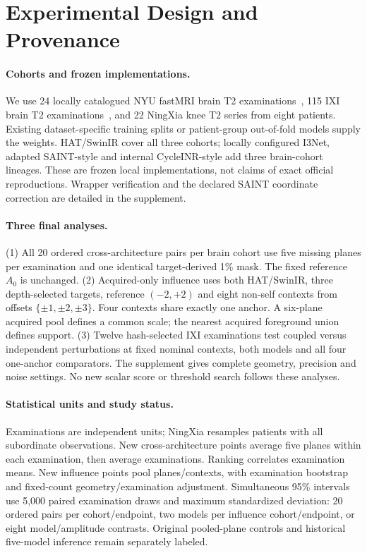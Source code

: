 \documentclass[10pt,twocolumn,letterpaper]{article}
\begin{document}
\section{Experimental Design and Provenance}
\paragraph{Cohorts and frozen implementations.}
We use 24 locally catalogued NYU fastMRI brain T2 examinations~\cite{knoll2020fastmri,muckley2021brain,fastmri_portal}, 115 IXI brain T2 examinations~\cite{ixi_dataset}, and 22 NingXia knee T2 series from eight patients. Existing dataset-specific training splits or patient-group out-of-fold models supply the weights. HAT/SwinIR cover all three cohorts; locally configured I3Net, adapted SAINT-style and internal CycleINR-style add three brain-cohort lineages. These are frozen local implementations, not claims of exact official reproductions. Wrapper verification and the declared SAINT coordinate correction are detailed in the supplement.

\paragraph{Three final analyses.}
(1) All 20 ordered cross-architecture pairs per brain cohort use five missing planes per examination and one identical target-derived 1\% mask. The fixed reference $A_0$ is unchanged. (2) Acquired-only influence uses both HAT/SwinIR, three depth-selected targets, reference $(-2,+2)$ and eight non-self contexts from offsets $\{\pm1,\pm2,\pm3\}$. Four contexts share exactly one anchor. A six-plane acquired pool defines a common scale; the nearest acquired foreground union defines support. (3) Twelve hash-selected IXI examinations test coupled versus independent perturbations at fixed nominal contexts, both models and all four one-anchor comparators. The supplement gives complete geometry, precision and noise settings. No new scalar score or threshold search follows these analyses.

\paragraph{Statistical units and study status.}
Examinations are independent units; NingXia resamples patients with all subordinate observations. New cross-architecture points average five planes within each examination, then average examinations. Ranking correlates examination means. New influence points pool planes/contexts, with examination bootstrap and fixed-count geometry/examination adjustment. Simultaneous 95\% intervals use 5,000 paired examination draws and maximum standardized deviation: 20 ordered pairs per cohort/endpoint, two models per influence cohort/endpoint, or eight model/amplitude contrasts. Original pooled-plane controls and historical five-model inference remain separately labeled.
\end{document}
